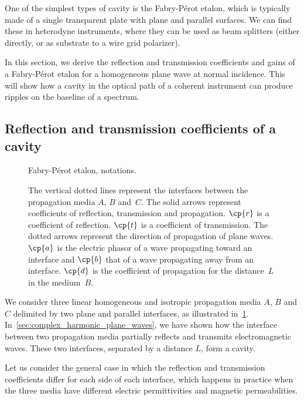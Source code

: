 \begin{refsection}
One of the simplest types of cavity is the Fabry-Pérot etalon, which is typically made of a single transparent plate with plane and parallel surfaces.
We can find these in heterodyne instruments, where they can be used as beam splitters (either directly, or as substrate to a wire grid polarizer).

In this section, we derive the reflection and transmission coefficients and gains of a Fabry-Pérot etalon for a homogeneous plane wave at normal incidence.
This will show how a cavity in the optical path of a coherent instrument can produce ripples on the baseline of a spectrum.




\subsection{Reflection and transmission coefficients of a cavity}

\begin{figure}
    \centering
    
    \caption{Fabry-Pérot etalon, notations.}
    \caption*{
       The vertical dotted lines represent the interfaces between the propagation media $A$, $B$ and~$C$.
       The solid arrows represent coefficients of reflection, transmission and propagation.
       $\cp{r}$ is a coefficient of reflection.
       $\cp{t}$ is a coefficient of transmission.
       The dotted arrows represent the direction of propagation of plane waves.
       $\cp{a}$ is the electric phasor of a wave propagating toward an interface and
       $\cp{b}$ that of a wave propagating away from an interface.
       $\cp{d}$ is the coefficient of propagation for the distance~$L$ in the medium~$B$.
    }
    \label{fig:cavity_notations}
\end{figure}

We consider three linear homogeneous and isotropic propagation media $A$, $B$ and $C$
delimited by two plane and parallel interfaces, as illustrated in~\cref{fig:cavity_notations}.
In~\cref{sec:complex_harmonic_plane_waves}, we have shown how the interface between two propagation media partially reflects and transmits electromagnetic waves.
These two interfaces, separated by a distance $L$, form a cavity.

Let us consider the general case in which the reflection and transmission coefficients differ for each side of each interface,
which happens in practice when the three media have different electric permittivities and magnetic permeabilities.


\end{refsection}
